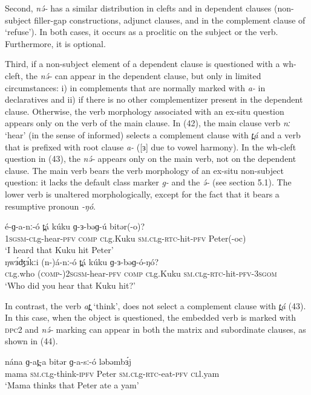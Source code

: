 Second, \textit{nə́-} has a similar distribution in clefts and in dependent clauses (non-subject filler-gap constructions, adjunct clauses, and in the complement clause of ‘refuse’). In both cases, it occurs as a proclitic on the subject or the verb. Furthermore, it is optional. 

Third, if a non-subject element of a dependent clause is questioned with a wh-cleft, the \textit{nə́-} can appear in the dependent clause, but only in limited circumstances: i) in complements that are normally marked with \textit{a-} in declaratives and ii) if there is no other complementizer present in the dependent clause. Otherwise, the verb morphology associated with an ex-situ question appears only on the verb of the main clause. In (42), the main clause verb \textit{nː} ‘hear’ (in the sense of informed) selects a complement clause with \textit{t̪á} and a verb that is prefixed with root clause \textit{a-} ([ɜ] due to vowel harmony). In the wh-cleft question in (43), the \textit{nə́-} appears only on the main verb, not on the dependent clause. The main verb bears the verb morphology of an ex-situ non-subject question: it lacks the default class marker \textit{g-} and the \textit{ə́-} (see section 5.1). The lower verb is unaltered morphologically, except for the fact that it bears a resumptive pronoun \textit{-ŋó}.

\ea
\ea \gll	é-ɡ-a-nː-ó	t̪á	kúku	ɡ-ɜ-bəɡ-ú	bitər(-o)? \\
   1\textsc{sgsm-cl}g-hear-\textsc{pfv}	\textsc{comp}	\textsc{cl}g.Kuku	\textsc{sm.cl}g-\textsc{rtc}-hit-\textsc{pfv}   	Peter(-oc)\\
\trans	‘I heard that Kuku hit Peter’\\
\ex \gll	ŋwɜ́ʤɜ́kːi	(n-)á-nː-ó	t̪á	kúku		ɡ-ɜ-bəɡ-ó-ŋó? \\
   \textsc{cl}g.who	(\textsc{comp-})2\textsc{sgsm}-hear-\textsc{pfv}	\textsc{comp} \textsc{cl}g.Kuku	\textsc{sm.cl}g-\textsc{rtc}-hit-\textsc{pfv}-3\textsc{sgom}\\
\trans	‘Who did you hear that Kuku hit?’\\
\z
\z

In contrast, the verb \textit{at̪} ‘think’, does not select a complement clause with \textit{t̪á} (43). In this case, when the object is questioned, the embedded verb is marked with \textsc{dpc}2 and \textit{nə́-} marking can appear in both the matrix and subordinate clauses, as shown in (44).

\ea
\gll	nána	ɡ-at̪-a	bitər	ɡ-a-sː-ó	ləbəmbɜ́j\\
mama	\textsc{sm.cl}g-think-\textsc{ipfv}	Peter	\textsc{sm.cl}g-\textsc{rtc}-eat-\textsc{pfv}	\textsc{cl}l.yam\\
\trans ‘Mama thinks that Peter ate a yam’\\
\z

